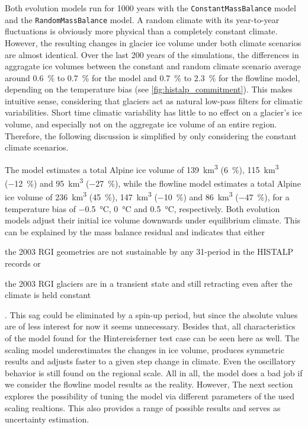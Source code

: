    Both evolution models run for 1000 years with the \lstinline`ConstantMassBalance` model and the \lstinline`RandomMassBalance` model. A random climate with its year-to-year fluctuations is obviously more physical than a completely constant climate. However, the resulting changes in glacier ice volume under both climate scenarios are almost identical. Over the last 200 years of the simulations, the differences in aggragate ice volumes between the constant and random climate scenario average around \SI{0.6}{\percent} to \SI{0.7}{\percent} for the \vas{} model and \SI{0.7}{\percent} to \SI{2.3}{\percent} for the flowline model, depending on the temperature bias (see \ref{fig:histalp_commitment}). %
    This makes intuitive sense, considering that glaciers act as natural low-pass filters for climatic variabilities. Short time climatic variability has little to no effect on a glacier's ice volume, and especially not on the aggregate ice volume of an entire region. Therefore, the following discussion is simplified by only considering the constant climate scenarios.

    The \vas{} model estimates a total Alpine ice volume of \SI{139}{\cubic\kilo\meter} (\SI{+6}{\percent}), \SI{115}{\cubic\kilo\meter} (\SI{-12}{\percent}) and \SI{95}{\cubic\kilo\meter} (\SI{-27}{\percent}), while the flowline model estimates a total Alpine ice volume of \SI{236}{\cubic\kilo\meter} (\SI{+45}{\percent}), \SI{147}{\cubic\kilo\meter} (\SI{-10}{\percent}) and \SI{86}{\cubic\kilo\meter} (\SI{-47}{\percent}), for a temperature bias of \SI{-.5}{\celsius}, \SI{0}{\celsius} and \SI{+.5}{\celsius}, respectively. 
    Both evolution models adjust their initial ice volume downwards under equilibrium climate. This can be explained by the mass balance residual \bias{} and indicates that either
    \begin{enumerate*}[label=(\alph*)]
      \item the 2003 RGI geometries are not sustainable by any 31-period in the HISTALP records or
      \item the 2003 RGI glaciers are in a transient state and still retracting even after the climate is held constant
    \end{enumerate*}
    \citep{Maussion2019}.
    This sag could be eliminated by a spin-up period, but since the absolute values are of less interest for now it seems unnecessary. Besides that, all characteristics of the \vas{} model found for the Hintereisferner test case can be seen here as well. The \vas{} scaling model underestimates the changes in ice volume, produces symmetric results and adjusts faster to a given step change in climate. %
    Even the oscillatory behavior is still found on the regional scale.
    All in all, the \vas{} model does a bad job if we consider the flowline model results as the reality. However, 
    The next section explores the possibility of tuning the \vas{} model via different parameters of the used scaling realtions. This also provides a range of possible results and serves as uncertainty estimation.

